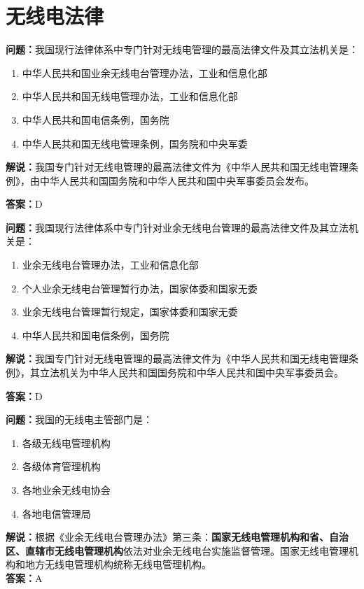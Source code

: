 \chapter{无线电法律}

\textbf{问题：}我国现行法律体系中专门针对无线电管理的最高法律文件及其立法机关是：

\begin{enumerate}[label=\Alph*), leftmargin=1cm]
	\item 中华人民共和国业余无线电台管理办法，工业和信息化部
	\item 中华人民共和国无线电管理办法，工业和信息化部
	\item 中华人民共和国电信条例，国务院
	\item 中华人民共和国无线电管理条例，国务院和中央军委
\end{enumerate}

\textbf{解说：}我国专门针对无线电管理的最高法律文件为《中华人民共和国无线电管理条例》，由中华人民共和国国务院和中华人民共和国中央军事委员会发布。

\textbf{答案：}D

\textbf{问题：}我国现行法律体系中专门针对业余无线电台管理的最高法律文件及其立法机关是：

\begin{enumerate}[label=\Alph*), leftmargin=1cm]
	\item 业余无线电台管理办法，工业和信息化部
	\item 个人业余无线电台管理暂行办法，国家体委和国家无委
	\item 业余无线电台管理暂行规定，国家体委和国家无委
	\item 中华人民共和国电信条例，国务院
\end{enumerate}

\textbf{解说：}我国专门针对无线电管理的最高法律文件为《中华人民共和国无线电管理条例》，其立法机关为中华人民共和国国务院和中华人民共和国中央军事委员会。

\textbf{答案：}D

\textbf{问题：}我国的无线电主管部门是：

\begin{enumerate}[label=\Alph*), leftmargin=1cm]
	\item 各级无线电管理机构
	\item 各级体育管理机构
	\item 各地业余无线电协会
	\item 各地电信管理局
\end{enumerate}

\textbf{解说：}根据《业余无线电台管理办法》第三条：\textbf{国家无线电管理机构和省、自治区、直辖市无线电管理机构}依法对业余无线电台实施监督管理。国家无线电管理机构和地方无线电管理机构统称无线电管理机构。\\\textbf{答案：}A

